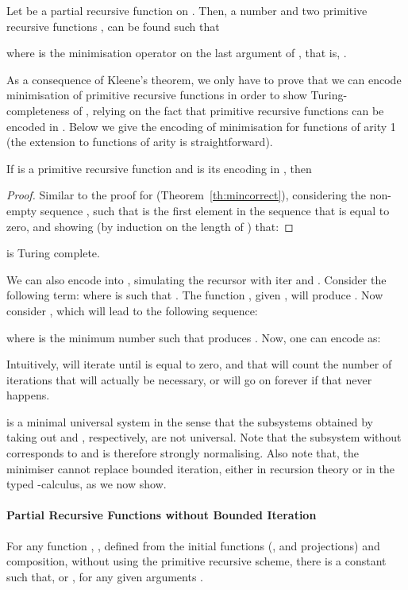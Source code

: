 \documentclass{article}
\begin{document}
\begin{theorem} 
Let  be a partial recursive function on . Then, a number
 and two primitive recursive functions ,  can be found such that

where  is the minimisation operator on the last argument of , that is,
.
\end{theorem} 

As a consequence of Kleene's theorem, we only have to prove that we
can encode minimisation of primitive recursive functions in order to
show Turing-completeness of , relying on the fact that primitive
recursive functions can be encoded in \LLCI. Below we give the
encoding of minimisation for functions of arity 1 (the extension to
functions of arity  is straightforward).

\begin{theorem} 
\label{th:encmin}
If  is
 a primitive recursive function and  is its encoding in \LLCIm, then

\end{theorem}

\begin{proof} 
Similar to the proof for \LLCIrec (Theorem~\ref{th:mincorrect}), considering the non-empty sequence , such that  is the first element in the sequence that is equal to
zero, and showing (by induction on the length of ) that: 
\end{proof}
\begin{corollary} 
\LLCIm is Turing complete.
\end{corollary}
We can also encode \LLCIrec into \LLCIm, simulating the recursor with iter
and . Consider the following term:
 where  is such that
. The function , given , will produce . Now consider , which will lead to the following sequence:
  
where  is the minimum number such that   
produces .
Now, one can encode  as:


Intuitively,  will iterate 
until  is equal to zero, and that  will
count the number of iterations that will actually be necessary, or
will go on forever if that never happens.

\LLCIm is a minimal universal system in the sense that the subsystems obtained by taking out  and , respectively, are not universal. Note that the subsystem without  corresponds to \LLCI and is therefore strongly normalising.
Also note that, the minimiser cannot replace bounded iteration, either in recursion theory or in the typed -calculus, as we now show.
\paragraph{Partial Recursive Functions without Bounded Iteration}
\begin{lemma}
For any function , , defined from the initial
functions (,  and projections) and composition,
without using the primitive recursive scheme, there is a constant  such that, 
  or
, for any given arguments .
\end{lemma}
\end{document}

